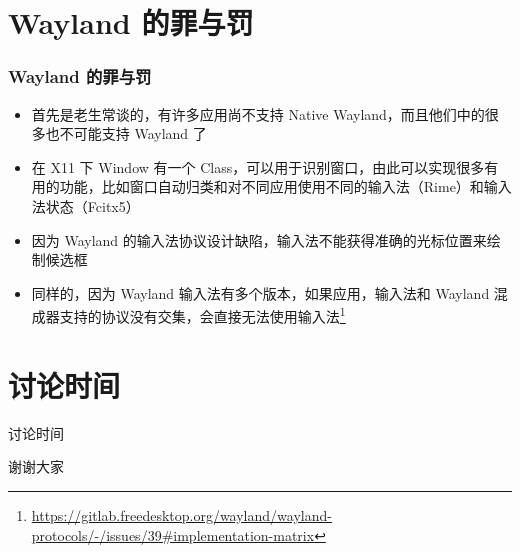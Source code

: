 \documentclass[UTF-8]{ctexbeamer}
\begin{document}
\section{Wayland 的罪与罚}
\begin{frame}
	\frametitle{Wayland 的罪与罚}
	
	\begin{itemize}
		\item 首先是老生常谈的，有许多应用尚不支持 Native Wayland，而且他们中的很多也不可能支持 Wayland 了
		\item 在 X11 下 Window 有一个 Class，可以用于识别窗口，由此可以实现很多有用的功能，比如窗口自动归类和对不同应用使用不同的输入法（Rime）和输入法状态（Fcitx5）
		\item 因为 Wayland 的输入法协议设计缺陷，输入法不能获得准确的光标位置来绘制候选框
		\item 同样的，因为 Wayland 输入法有多个版本，如果应用，输入法和 Wayland 混成器支持的协议没有交集，会直接无法使用输入法\footnote{\url{https://gitlab.freedesktop.org/wayland/wayland-protocols/-/issues/39\#implementation-matrix}}
	\end{itemize}
	
\end{frame}

\section{讨论时间}
\begin{frame}
	\begin{center}
		\huge{讨论时间}
	\end{center}
\end{frame}
\begin{frame}
	\begin{center}
		\huge{谢谢大家}
	\end{center}
\end{frame}
\end{document}
